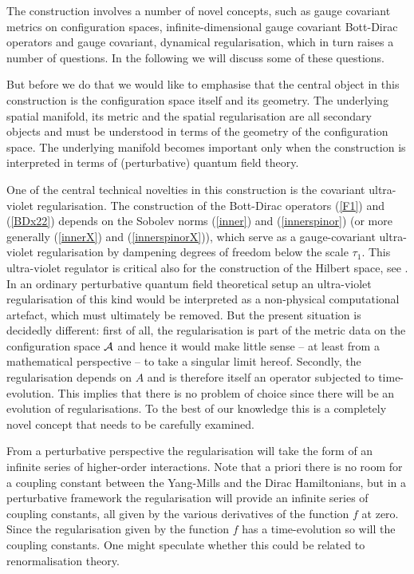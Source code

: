 \documentclass[12pt]{article}
\def\ca{{\cal A}}
\begin{document}
 

  The construction involves a number of novel concepts, such as gauge covariant metrics on configuration spaces, infinite-dimensional gauge covariant Bott-Dirac operators and gauge covariant, dynamical regularisation, which in turn raises a number of questions. In the following we will discuss some of these questions.

 But before we do that we would like to emphasise that the central object in this construction is the configuration space itself and its geometry. The underlying spatial manifold, its metric and the spatial regularisation are all secondary objects and must be understood in terms of the geometry of the configuration space. The underlying manifold becomes important only when the construction is interpreted in terms of (perturbative) quantum field theory.


One of the central technical novelties in this construction is the covariant ultra-violet regularisation. The construction of the Bott-Dirac operators (\ref{F1}) and (\ref{BDx22}) depends on the Sobolev norms (\ref{inner}) and (\ref{innerspinor}) (or more generally (\ref{innerX}) and (\ref{innerspinorX})), which serve as a gauge-covariant ultra-violet regularisation by dampening degrees of freedom below the scale $\tau_1$. This ultra-violet regulator is critical also for the construction of the Hilbert space, see \cite{Aastrup:2019yui}. In an ordinary perturbative quantum field theoretical setup an ultra-violet regularisation of this kind would be interpreted as a non-physical computational artefact, which must ultimately be removed. But the present situation is decidedly different: first of all, the regularisation is part of the metric data on the configuration space $\ca$ and hence it would make little sense -- at least from a mathematical perspective -- to take a singular limit hereof. Secondly, the regularisation depends on $A$ and is therefore itself an operator subjected to time-evolution. This implies that there is no problem of choice since there will be an evolution of regularisations. 
To the best of our knowledge this is a completely novel concept that needs to be carefully examined. 

From a perturbative perspective the regularisation will take the form of an infinite series of higher-order interactions. Note that a priori there is no room for a coupling constant between the Yang-Mills and the Dirac Hamiltonians, but in a perturbative framework the regularisation will provide an infinite series of coupling constants, all given by the various derivatives of the function $f$ at zero. Since the regularisation given by the function $f$ has a time-evolution so will the coupling constants. One might speculate whether this could be related to renormalisation theory.
\end{document}

